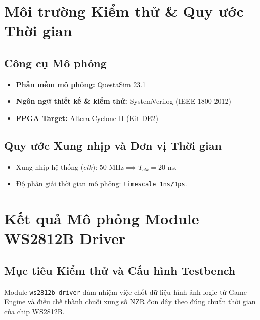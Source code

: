 \documentclass[12pt,a4paper]{article}
\begin{document}
\section{Môi trường Kiểm thử \& Quy ước Thời gian}
\subsection{Công cụ Mô phỏng}
\begin{itemize}
    \item \textbf{Phần mềm mô phỏng:} QuestaSim 23.1
    \item \textbf{Ngôn ngữ thiết kế \& kiểm thử:} SystemVerilog (IEEE 1800-2012)
    \item \textbf{FPGA Target:} Altera Cyclone II (Kit DE2)
\end{itemize}

\subsection{Quy ước Xung nhịp và Đơn vị Thời gian}
\begin{itemize}
    \item Xung nhịp hệ thống ($clk$): $50\text{ MHz} \implies T_{clk} = 20\text{ ns}$.
    \item Độ phân giải thời gian mô phỏng: \texttt{timescale 1ns/1ps}.
\end{itemize}

\newpage

\section{Kết quả Mô phỏng Module WS2812B Driver}

\subsection{Mục tiêu Kiểm thử và Cấu hình Testbench}

Module \texttt{ws2812b\_driver} đảm nhiệm việc chốt dữ liệu hình ảnh logic từ Game Engine và điều chế thành chuỗi xung số NZR đơn dây theo đúng chuẩn thời gian của chip WS2812B.
\end{document}
